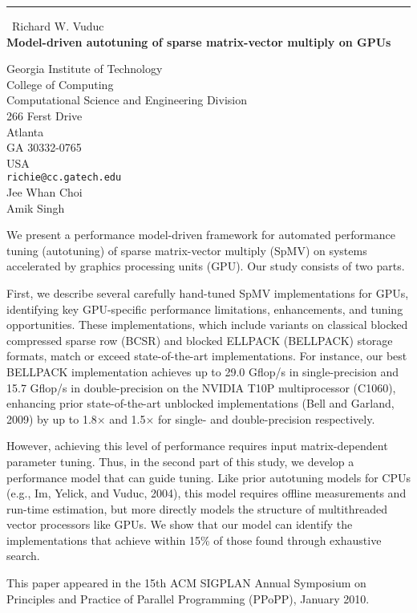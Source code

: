 \documentclass{report}
\begin{document}
\begin{center}
\rule{6in}{1pt} \
{\large Richard W. Vuduc \\
{\bf Model-driven autotuning of sparse matrix-vector multiply on GPUs}}

Georgia Institute of Technology \\ College of Computing \\ Computational Science and Engineering Division \\ 266 Ferst Drive \\ Atlanta \\ GA 30332-0765 \\ USA
\\
{\tt richie@cc.gatech.edu}\\
Jee Whan Choi\\
Amik Singh\end{center}

We present a performance model-driven framework for automated
performance tuning (autotuning) of sparse matrix-vector multiply
(SpMV) on systems accelerated by graphics processing units (GPU). Our
study consists of two parts.

First, we describe several carefully hand-tuned SpMV implementations
for GPUs, identifying key GPU-specific performance limitations,
enhancements, and tuning opportunities. These implementations, which
include variants on classical blocked compressed sparse row (BCSR) and
blocked ELLPACK (BELLPACK) storage formats, match or exceed
state-of-the-art implementations. For instance, our best BELLPACK
implementation achieves up to 29.0 Gflop/s in single-precision and 15.7
Gflop/s in double-precision on the NVIDIA T10P multiprocessor (C1060),
enhancing prior state-of-the-art unblocked implementations (Bell and Garland, 2009)
by up to 1.8$\times$ and 1.5$\times$ for single- and double-precision respectively.

However, achieving this level of performance requires input
matrix-dependent parameter tuning. Thus, in the second part of this
study, we develop a performance model that can guide tuning. Like
prior autotuning models for CPUs (e.g., Im, Yelick, and Vuduc, 2004),
this model requires offline measurements and run-time estimation, but
more directly models the structure of multithreaded vector processors
like GPUs. We show that our model can identify the implementations
that achieve within 15\% of those found through exhaustive search.

This paper appeared in the 15th ACM SIGPLAN Annual Symposium on
Principles and Practice of Parallel Programming (PPoPP), January 2010.
\end{document}
